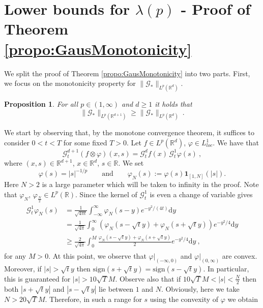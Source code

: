\documentclass[a4paper, reqno]{amsart}
\newtheorem{proposition}[thm]{Proposition}
\theoremstyle{definition}
\newcommand{\dd}{{\mathrm d}}
\newcommand{\mG}{\mathcal{G}}
\newcommand{\lm}{\lambda}
\begin{document}
\section{Lower bounds for $\lm(p)$ - Proof of Theorem \ref{propo:GausMonotonicity}}\label{sec:lowerBound}
We split the proof of Theorem \ref{propo:GausMonotonicity} into two parts. First, we focus on the monotonicity property for $\|\mG_\ast\|_{L^p(\mathbb{R}^d)}$. 

\begin{proposition}\label{propo2:GausMonotonicity}
    For all $p\in(1,\infty)$ and $d\geq 1$ it holds that
    $$\|\mathcal{G}_\ast\|_{L^p(\mathbb{R}^{d+1})}\geq \| \mathcal{G}_\ast\|_{L^p(\mathbb{R}^d)}~.$$
\end{proposition}
\proof We start by observing that, by the monotone convergence theorem, it suffices to consider $0<t<T$ for some fixed $T>0$. 
Let $f\in L^p(\mathbb{R}^d)$, $\varphi\in L^1_{loc}$. We have that
\begin{equation*}
    \mG^{d+1}_t(f\otimes\varphi)(x,s)=\mG_t^df(x)\,\mG_t^1\varphi (s)~,
\end{equation*}
where $(x,s)\in\mathbb{R}^{d+1}$, $x\in\mathbb{R}^d$, $s\in\mathbb{R}$. We set \begin{equation}
\label{eq: phi,phi_N}
\varphi(s)=|s|^{-1/p}\qquad \textrm{and}\qquad  \varphi_N(s):=\varphi(s)\mathbf{1}_{[1,N]}(|s|).
\end{equation}Here $N>2$ is a large parameter which will be taken to infinity in the proof. Note that $\varphi_N, \, \varphi_{\frac{N}{2}}\in L^p(\mathbb{R})$.
Since the kernel of $\mG_t^1$ is even a change of variable gives
\begin{align}
\begin{split}\label{eq:convexity_low_b}
\mG_t^1\varphi_N (s) & = \frac{1}{\sqrt{4\pi t}} \int_{-\infty}^\infty \varphi_N(s-y) e^{-y^2/(4t)}\dd y\\
& = \frac{1}{\sqrt{4\pi }} \int_0^\infty \left( \varphi_N(s-\sqrt{t}y)+\varphi_N(s+\sqrt{t}y)\right) e^{-y^2/4}\dd y\\
& \geq \frac{2}{\sqrt{4\pi }} \int_0^M  \frac{\varphi_N(s-\sqrt{t}y)+\varphi_N(s+\sqrt{t}y)}{2} e^{-y^2/4}\dd y~,
\end{split}
\end{align}
for any $M>0$. At this point, we observe that $\varphi|_{(-\infty,0)}$ and $\varphi|_{(0,\infty)}$ are convex. Moreover, if $|s|>\sqrt{t}y$ then $\text{sign}(s+\sqrt{t}y)=\text{sign}(s-\sqrt{t}y)$. In particular, this is guaranteed for $|s|>10\sqrt{T}M$. Observe also that if $10\sqrt{T}M<|s|<\tfrac{N}{2}$ then both $|s+\sqrt{t}y|$ and $|s-\sqrt{t}y|$ lie between $1$ and $N$. Obviously, here we take $N>20\sqrt{T}M.$ Therefore, in such a range for $s$ using the convexity of $\varphi$ we obtain
\end{document}
